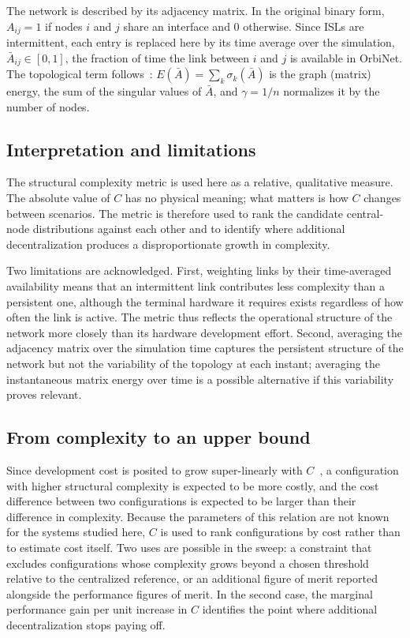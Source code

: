 \documentclass[11pt]{article}
\begin{document}
The network is described by its adjacency matrix. In the original binary form, $A_{ij} = 1$ if nodes $i$ and $j$ share an interface and $0$ otherwise. Since ISLs are intermittent, each entry is replaced here by its time average over the simulation, $\bar{A}_{ij} \in [0,1]$, the fraction of time the link between $i$ and $j$ is available in OrbiNet. The topological term follows~\cite{sinha2013}: $E(\bar{A}) = \sum_{k} \sigma_k(\bar{A})$ is the graph (matrix) energy, the sum of the singular values of $\bar{A}$, and $\gamma = 1/n$ normalizes it by the number of nodes.

\subsection{Interpretation and limitations}\label{subsec:complexity-limitations}

The structural complexity metric is used here as a relative, qualitative measure. The absolute value of $C$ has no physical meaning; what matters is how $C$ changes between scenarios. The metric is therefore used to rank the candidate central-node distributions against each other and to identify where additional decentralization produces a disproportionate growth in complexity.

Two limitations are acknowledged. First, weighting links by their time-averaged availability means that an intermittent link contributes less complexity than a persistent one, although the terminal hardware it requires exists regardless of how often the link is active. The metric thus reflects the operational structure of the network more closely than its hardware development effort. Second, averaging the adjacency matrix over the simulation time captures the persistent structure of the network but not the variability of the topology at each instant; averaging the instantaneous matrix energy over time is a possible alternative if this variability proves relevant.

\subsection{From complexity to an upper bound}\label{subsec:complexity-bound}

Since development cost is posited to grow super-linearly with $C$~\cite{sinha2013}, a configuration with higher structural complexity is expected to be more costly, and the cost difference between two configurations is expected to be larger than their difference in complexity. Because the parameters of this relation are not known for the systems studied here, $C$ is used to rank configurations by cost rather than to estimate cost itself. Two uses are possible in the sweep: a constraint that excludes configurations whose complexity grows beyond a chosen threshold relative to the centralized reference, or an additional figure of merit reported alongside the performance figures of merit. In the second case, the marginal performance gain per unit increase in $C$ identifies the point where additional decentralization stops paying off.
\end{document}

